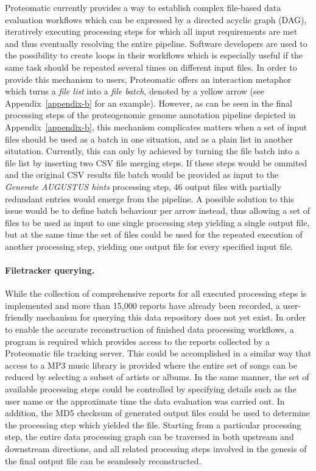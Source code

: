 Proteomatic currently provides a way to establish complex file-based data 
evaluation workflows which can be expressed by a directed acyclic graph (DAG),
iteratively executing processing steps for which all input requirements are
met and thus eventually resolving the entire pipeline.
Software developers are used to the possibility to create loops in their
workflows which is especially useful if the same task should be repeated
several times on different input files.
In order to provide this mechanism to users, Proteomatic offers an interaction 
metaphor which turns a {\em file list} into a {\em file batch}, denoted by a 
yellow arrow (see Appendix~\ref{appendix-b} for an example).
However, as can be seen in the final processing steps of the proteogenomic
genome annotation pipeline depicted in Appendix~\ref{appendix-b}, 
this mechanism complicates matters when
a set of input files should be used as a batch in one situation, and as a
plain list in another situtation.
Currently, this can only by achieved by turning the file batch into a file
list by inserting two CSV file merging steps.
If these steps would be ommited and the original CSV results file batch
would be provided as input to the {\em Generate AUGUSTUS hints} processing
step, 46 output files with partially redundant entries would emerge from
the pipeline.
A possible solution to this issue would be to define batch behaviour per
arrow instead, thus allowing a set of files to be used as input to one single 
processing step yielding a single output file, but at the same time the
set of files could be used for the repeated execution of another processing
step, yielding one output file for every specified input file.

\paragraph{Filetracker querying.}

While the collection of comprehensive reports for all executed processing steps
is implemented and more than 15,000 reports have already been recorded, a
user-friendly mechanism for querying this data repository does not yet exist.
In order to enable the accurate reconstruction of finished data processing 
workflows, a program is required which provides access to the reports collected
by a Proteomatic file tracking server.
This could be accomplished in a similar way that access to a MP3 music library 
is provided where the entire set of songs can be reduced by selecting a subset 
of artists or albums. 
In the same manner, the set of available processing steps could be controlled
by specifying details such as the user name or the approximate time the data
evaluation was carried out.
In addition, the MD5 checksum of generated output files could be used to 
determine the processing step which yielded the file.
Starting from a particular processing step, the entire data processing graph
can be traversed in both upstream and downstream directions, and all related
processing steps involved in the genesis of the final output file can
be seamlessly reconstructed.

